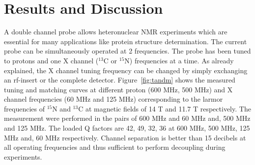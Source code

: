 \documentclass[preprint,12pt]{article}
\begin{document}
\section{Results and Discussion}
A double channel probe allows heteronuclear NMR experiments which are essential for many applications like protein structure determination. The current probe can be simultaneously operated at 2 frequencies. The probe has been tuned to protons and one X channel ($^{13}$C or $^{15}$N) frequencies at a time. As already explained, the X channel tuning frequency can be changed by simply exchanging an rf-insert or the complete detector. Figure~\ref{fig:tandm} shows the measured tuning and matching curves at different proton (600 MHz, 500 MHz) and X channel frequencies (60 MHz and 125 MHz) corresponding to the larmor frequencies of $^{15}$N and $^{13}$C at magnetic fields of 14 T and 11.7 T respectively. The measurement were performed in the pairs of 600 MHz and 60 MHz and, 500 MHz and 125 MHz. The loaded Q factors are 42, 49, 32, 36 at 600 MHz, 500 MHz, 125 MHz and, 60 MHz respectively. Channel separation is better than 15 decibels at all operating frequencies and thus sufficient to perform decoupling during experiments.\par
\end{document}

